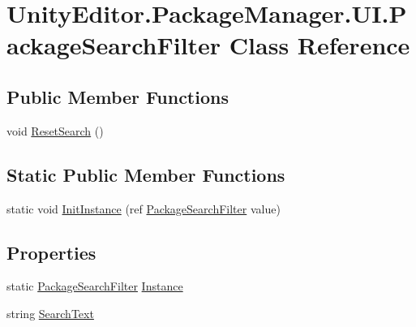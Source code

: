 \hypertarget{class_unity_editor_1_1_package_manager_1_1_u_i_1_1_package_search_filter}{}\section{Unity\+Editor.\+Package\+Manager.\+U\+I.\+Package\+Search\+Filter Class Reference}
\label{class_unity_editor_1_1_package_manager_1_1_u_i_1_1_package_search_filter}
\subsection*{Public Member Functions}
\begin{DoxyCompactItemize}
\item 
void \mbox{\hyperlink{class_unity_editor_1_1_package_manager_1_1_u_i_1_1_package_search_filter_a78cf1d3adc309c6801451de379447b56}{Reset\+Search}} ()
\end{DoxyCompactItemize}
\subsection*{Static Public Member Functions}
\begin{DoxyCompactItemize}
\item 
static void \mbox{\hyperlink{class_unity_editor_1_1_package_manager_1_1_u_i_1_1_package_search_filter_a8e5085dce56152e49c9d4523cbb28b8c}{Init\+Instance}} (ref \mbox{\hyperlink{class_unity_editor_1_1_package_manager_1_1_u_i_1_1_package_search_filter}{Package\+Search\+Filter}} value)
\end{DoxyCompactItemize}
\subsection*{Properties}
\begin{DoxyCompactItemize}
\item 
static \mbox{\hyperlink{class_unity_editor_1_1_package_manager_1_1_u_i_1_1_package_search_filter}{Package\+Search\+Filter}} \mbox{\hyperlink{class_unity_editor_1_1_package_manager_1_1_u_i_1_1_package_search_filter_aad55f0a0081312f0bded8426819e1f30}{Instance}}
\item 
string \mbox{\hyperlink{class_unity_editor_1_1_package_manager_1_1_u_i_1_1_package_search_filter_a7db2d94e9048fca9990339590e889e69}{Search\+Text}}
\end{DoxyCompactItemize}


